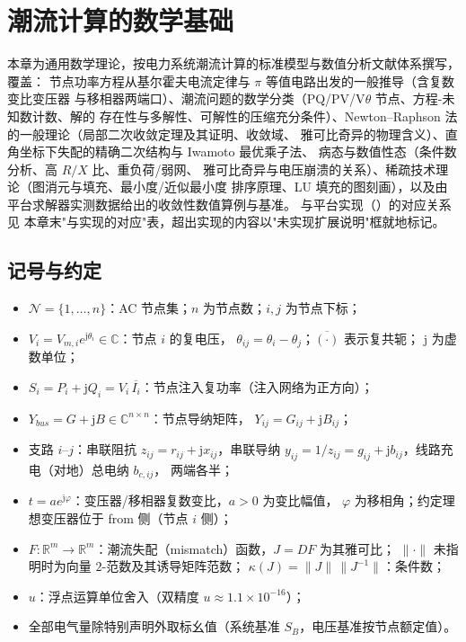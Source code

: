 
\section{潮流计算的数学基础}\label{sec:pf-th-fund}

\begin{theorynote}
本章为通用数学理论，按电力系统潮流计算的标准模型与数值分析文献体系撰写，覆盖：
节点功率方程从基尔霍夫电流定律与 $\pi$ 等值电路出发的一般推导（含复数变比变压器
与移相器两端口）、潮流问题的数学分类（PQ/PV/V$\theta$ 节点、方程-未知数计数、解的
存在性与多解性、可解性的压缩充分条件）、Newton--Raphson 法的一般理论（局部二次收敛定理及其证明、收敛域、
雅可比奇异的物理含义）、直角坐标下失配的精确二次结构与 Iwamoto 最优乘子法、
病态与数值性态（条件数分析、高 $R/X$ 比、重负荷/弱网、
雅可比奇异与电压崩溃的关系）、稀疏技术理论（图消元与填充、最小度/近似最小度
排序原理、LU 填充的图刻画），以及由平台求解器实测数据给出的收敛性数值算例与基准。
与平台实现（）的对应关系见
本章末"与实现的对应"表，超出实现的内容以"未实现扩展说明"框就地标记。
\end{theorynote}

\subsection{记号与约定}
\begin{itemize}
  \item $\mathcal N=\{1,\dots,n\}$：AC 节点集；$n$ 为节点数；$i,j$ 为节点下标；
  \item $V_i=V_{m,i}e^{\mathrm j\theta_i}\in\mathbb C$：节点 $i$ 的复电压，
        $\theta_{ij}=\theta_i-\theta_j$；$\overline{(\cdot)}$ 表示复共轭；
        $\mathrm j$ 为虚数单位；
  \item $S_i=P_i+\mathrm jQ_i=V_i\,\overline{I_i}$：节点注入复功率（注入网络为正方向）；
  \item $Y_{bus}=G+\mathrm jB\in\mathbb C^{n\times n}$：节点导纳矩阵，
        $Y_{ij}=G_{ij}+\mathrm jB_{ij}$；
  \item 支路 $i$--$j$：串联阻抗 $z_{ij}=r_{ij}+\mathrm jx_{ij}$，串联导纳
        $y_{ij}=1/z_{ij}=g_{ij}+\mathrm jb_{ij}$，线路充电（对地）总电纳 $b_{c,ij}$，
        两端各半；
  \item $t=ae^{\mathrm j\varphi}$：变压器/移相器复数变比，$a>0$ 为变比幅值，
        $\varphi$ 为移相角；约定理想变压器位于 from 侧（节点 $i$ 侧）；
  \item $F:\mathbb R^m\to\mathbb R^m$：潮流失配（mismatch）函数，$J=DF$ 为其雅可比；
        $\lVert\cdot\rVert$ 未指明时为向量 $2$-范数及其诱导矩阵范数；
        $\kappa(J)=\lVert J\rVert\,\lVert J^{-1}\rVert$：条件数；
  \item $u$：浮点运算单位舍入（双精度 $u\approx1.1\times10^{-16}$）；
  \item 全部电气量除特别声明外取标幺值（系统基准 $S_B$，电压基准按节点额定值）。
\end{itemize}

